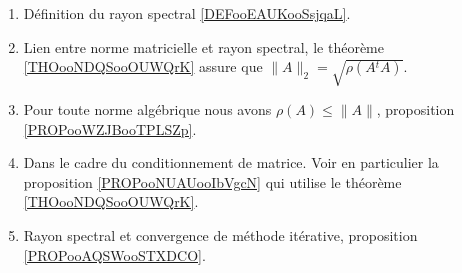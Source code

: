              \label{THEMEooOJJFooWMSAtL}

    \begin{enumerate}
        \item
            Définition du rayon spectral \ref{DEFooEAUKooSsjqaL}.
        \item
            Lien entre norme matricielle et rayon spectral, le théorème \ref{THOooNDQSooOUWQrK} assure que $\|A\|_2=\sqrt{\rho(A{^t}A)}$.
        \item
            Pour toute norme algébrique nous avons \( \rho(A)\leq \| A \|\), proposition \ref{PROPooWZJBooTPLSZp}.
        \item
            Dans le cadre du conditionnement de matrice. Voir en particulier la proposition \ref{PROPooNUAUooIbVgcN} qui utilise le théorème \ref{THOooNDQSooOUWQrK}.
        \item
            Rayon spectral et convergence de méthode itérative, proposition \ref{PROPooAQSWooSTXDCO}.
    \end{enumerate}

